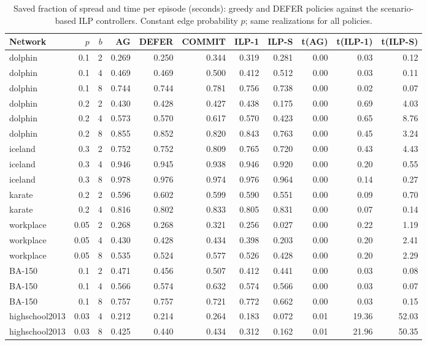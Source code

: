 \documentclass[11pt]{article}
\theoremstyle{definition}
\theoremstyle{remark}
\begin{document}
\begin{table}[h]
\centering
\caption{Saved fraction of spread and time per episode (seconds): greedy and DEFER
policies against the scenario-based ILP controllers. Constant edge probability
$p$; same realizations for all policies.\label{tab:ilp}}
\footnotesize
\begin{tabular}{lrrrrrrrrrr}
\hline
Network & $p$ & $b$ & AG & DEFER & COMMIT & ILP-1 & ILP-S & t(AG) & t(ILP-1) & t(ILP-S)\\
\hline
dolphin & 0.1 & 2 & 0.269 & 0.250 & 0.344 & 0.319 & 0.281 & 0.00 & 0.03 & 0.12 \\
dolphin & 0.1 & 4 & 0.469 & 0.469 & 0.500 & 0.412 & 0.512 & 0.00 & 0.03 & 0.11 \\
dolphin & 0.1 & 8 & 0.744 & 0.744 & 0.781 & 0.756 & 0.738 & 0.00 & 0.02 & 0.07 \\
dolphin & 0.2 & 2 & 0.430 & 0.428 & 0.427 & 0.438 & 0.175 & 0.00 & 0.69 & 4.03 \\
dolphin & 0.2 & 4 & 0.573 & 0.570 & 0.617 & 0.570 & 0.423 & 0.00 & 0.65 & 8.76 \\
dolphin & 0.2 & 8 & 0.855 & 0.852 & 0.820 & 0.843 & 0.763 & 0.00 & 0.45 & 3.24 \\
iceland & 0.3 & 2 & 0.752 & 0.752 & 0.809 & 0.765 & 0.720 & 0.00 & 0.43 & 4.43 \\
iceland & 0.3 & 4 & 0.946 & 0.945 & 0.938 & 0.946 & 0.920 & 0.00 & 0.20 & 0.55 \\
iceland & 0.3 & 8 & 0.978 & 0.976 & 0.974 & 0.976 & 0.964 & 0.00 & 0.14 & 0.27 \\
karate & 0.2 & 2 & 0.596 & 0.602 & 0.599 & 0.590 & 0.551 & 0.00 & 0.09 & 0.70 \\
karate & 0.2 & 4 & 0.816 & 0.802 & 0.833 & 0.805 & 0.831 & 0.00 & 0.07 & 0.14 \\
workplace & 0.05 & 2 & 0.268 & 0.268 & 0.321 & 0.256 & 0.027 & 0.00 & 0.22 & 1.19 \\
workplace & 0.05 & 4 & 0.430 & 0.428 & 0.434 & 0.398 & 0.203 & 0.00 & 0.20 & 2.41 \\
workplace & 0.05 & 8 & 0.535 & 0.524 & 0.577 & 0.526 & 0.428 & 0.00 & 0.20 & 2.29 \\
BA-150 & 0.1 & 2 & 0.471 & 0.456 & 0.507 & 0.412 & 0.441 & 0.00 & 0.03 & 0.08 \\
BA-150 & 0.1 & 4 & 0.566 & 0.574 & 0.632 & 0.574 & 0.566 & 0.00 & 0.03 & 0.07 \\
BA-150 & 0.1 & 8 & 0.757 & 0.757 & 0.721 & 0.772 & 0.662 & 0.00 & 0.03 & 0.15 \\
highschool2013 & 0.03 & 4 & 0.212 & 0.214 & 0.264 & 0.183 & 0.072 & 0.01 & 19.36 & 52.03 \\
highschool2013 & 0.03 & 8 & 0.425 & 0.440 & 0.434 & 0.312 & 0.162 & 0.01 & 21.96 & 50.35 \\
\hline
\end{tabular}
\end{table}
\end{document}

